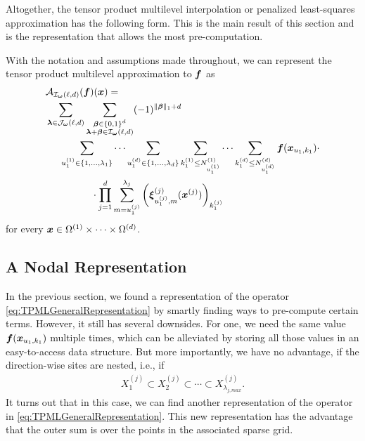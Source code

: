 \documentclass[	a4paper, 
								11pt]{article}
\theoremstyle{plain}
\begin{document}
Altogether, the tensor product multilevel interpolation or penalized 
least-squares approximation has the following form. This is the main result of 
this section and is the representation that allows the most pre-computation.

\begin{theorem}\label{thrm:FinalRepresentation}
With the notation and assumptions made throughout, we can represent the tensor product multilevel
approximation to $ \boldsymbol{f} $ as
\begin{align}\label{eq:NewRepresentationTPMLOperator}
 &\mathcal{A}_{\mathcal{I}_{\boldsymbol{\omega}}(\ell,d)}(\boldsymbol{f})(\boldsymbol{x}) = \nonumber \\
 &\sum_{\boldsymbol{\lambda} \in \mathcal{J}_{\boldsymbol{\omega}}
 (\ell,d)} \sum_{\substack{\boldsymbol{\beta} \in \{0,1\}^d \\ \boldsymbol{\lambda} + \boldsymbol{\beta} \in \mathcal{I}_
 {\boldsymbol{\omega}}(\ell,d)}}(-1)^{\|\boldsymbol{\beta}\|_1 + d} \nonumber \\
 &\phantom{\sum} \sum_{u^{(1)}_1 \in \{1, \dots, \lambda_1 \}} \cdots \sum_
 {u^{(d)}_1 \in \{1, \dots, \lambda_d \}} \sum_{k_1^{(1)} \leq N^{(1)}_
 {u_1^{(1)}}} \cdots \sum_{k_1^{(d)} \leq N^{(d)}_{u_1^{(d)}}} 
 \boldsymbol{f}(\boldsymbol{x}_{u_1, k_1}) \cdot \nonumber\\
 &\phantom{\sum \sum \sum}\cdot \prod_{j=1}^{d} \sum_{m = u_1^{(j)}}^{\lambda_{j}} \left( \boldsymbol{\xi}^{(j)}_{u_1^{(j)},m} (\boldsymbol{x}^{(j)}) \right)_{k_1^{(j)}} 
\end{align}
for every $ \boldsymbol{x} \in \Omega^{(1)} \times \cdots \times \Omega^{(d)} $.
\end{theorem}


\subsection{A Nodal Representation}\label{subsec:NodalRepresentation}

In the previous section, we found a representation of the operator \eqref{eq:TPMLGeneralRepresentation} by smartly finding ways to pre-compute certain terms. However, it still has several downsides. For one, we need the same value $ \boldsymbol{f}(\boldsymbol{x}_{u_1,k_1}) $ multiple times, which can be alleviated by storing all those values in an easy-to-access data structure. But more importantly, we have no advantage, if the direction-wise sites are nested, i.e., if 
\begin{align*}
    X^{(j)}_1 \subset X^{(j)}_2 \subset \cdots \subset X^{(j)}_{\lambda_{j,max}}.
\end{align*}
It turns out that in this case, we can find another representation of the operator in \eqref{eq:TPMLGeneralRepresentation}. This new representation has the advantage that the outer sum is over the points in the associated sparse grid. 
\end{document}
